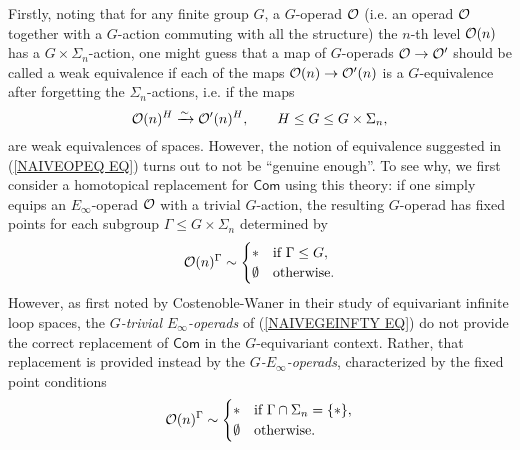 \documentclass[a4paper,10pt]{article}%
\begin{document}
Firstly, noting that for any finite group $G$, a $G$-operad $\mathcal{O}$ (i.e. an operad $\mathcal{O}$ together with a $G$-action commuting with all the structure)
the $n$-th level $\mathcal{O}(n)$ has a $G \times \Sigma_n$-action,
one might guess that a map of $G$-operads
$\mathcal{O} \to \mathcal{O}'$
should be called a weak equivalence if each of the maps
$\mathcal{O}(n) \to \mathcal{O}'(n)$
is a $G$-equivalence after forgetting the $\Sigma_n$-actions, 
i.e. if the maps
\begin{equation}\label{NAIVEOPEQ EQ}
	\mathcal{O}(n)^H \xrightarrow{\sim} \mathcal{O}'(n)^H, \qquad H \leq G \leq G\times \Sigma_n,
\end{equation}
are weak equivalences of spaces. 
However, the notion of equivalence suggested in (\ref{NAIVEOPEQ EQ}) turns out to not be ``genuine enough''.
To see why, we first consider a homotopical replacement for $\mathsf{Com}$ using this theory: 
if one simply equips an $E_{\infty}$-operad $\mathcal{O}$ with a trivial $G$-action, the resulting $G$-operad has fixed points for each subgroup $\Gamma \leq G \times \Sigma_n$
determined by
\begin{equation}\label{NAIVEGEINFTY EQ}
	\O(n)^{\Gamma} \sim 
\begin{cases}
	\** & \text{if } \Gamma \leq G,
\\
	\emptyset & \text{otherwise}.
\end{cases}
\end{equation}
However, as first noted by Costenoble-Waner \cite{CW91} in their study of equivariant infinite loop spaces,
the \textit{$G$-trivial $E_\infty$-operads} of (\ref{NAIVEGEINFTY EQ}) do not provide 
the correct replacement of $\mathsf{Com}$
 in the $G$-equivariant context. 
Rather, that replacement is provided instead by the 
\textit{$G$-$E_{\infty}$-operads}, characterized by the fixed point conditions
\begin{equation}\label{GENGEINFTY EQ}
	\O(n)^{\Gamma} \sim 
\begin{cases}
	\** & \text{if } \Gamma \cap \Sigma_n = \{\**\},
\\
	\emptyset & \text{otherwise}.
\end{cases}
\end{equation}
\end{document}
